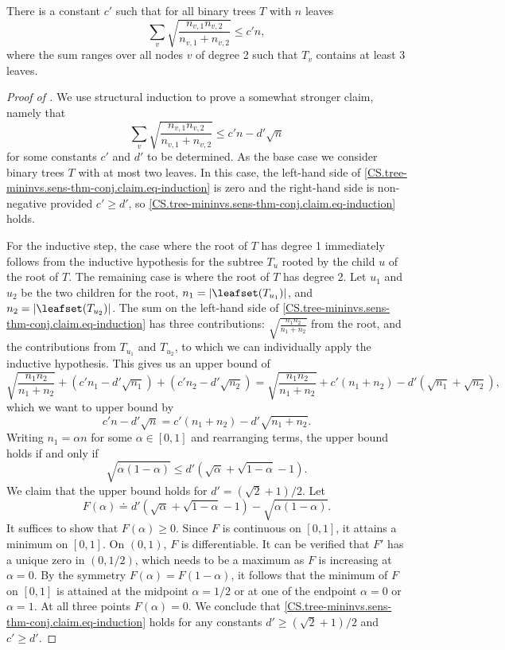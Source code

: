 \begin{claim}
    \label{claim:sensitivity:sum}
    There is a constant $c'$ such that for all binary trees $T$ with $n$ leaves 
    \begin{equation}
      \sum_v \sqrt{\frac{n_{v,1}n_{v,2}}{n_{v,1}+n_{v,2}}} \le c'n,
    \end{equation}
    where the sum ranges over all nodes $v$ of degree 2 such that $T_v$ contains at least 3 leaves.
  \end{claim}
\begin{proof}[Proof of ]
We use structural induction to prove a somewhat stronger claim, namely that
\begin{equation}\label{CS.tree-mininvs.sens-thm-conj.claim.eq-induction}
  \sum_v \sqrt{\frac{n_{v,1}n_{v,2}}{n_{v,1}+n_{v,2}}} \le c' n - d' \sqrt{n}
\end{equation}
for some constants $c'$ and $d'$ to be determined.
As the base case we consider binary trees $T$ with at most two leaves. In this case, the left-hand side of \eqref{CS.tree-mininvs.sens-thm-conj.claim.eq-induction} is zero and the right-hand side is non-negative provided $c' \ge d'$, so \eqref{CS.tree-mininvs.sens-thm-conj.claim.eq-induction} holds. 

For the inductive step, the case where the root of $T$ has degree 1 immediately follows from the inductive hypothesis for the subtree $T_u$ rooted by the child $u$ of the root of $T$. The remaining case is where the root of $T$ has degree 2. Let $u_1$ and $u_2$ be the two children for the root, $n_1 = \lvert\leafset(T_{u_1})\rvert$, and 
$n_2 = \lvert\leafset(T_{u_2})\rvert$. The sum on the left-hand side of \eqref{CS.tree-mininvs.sens-thm-conj.claim.eq-induction} has three contributions: $\sqrt{\frac{n_1 n_2}{n_1+n_2}}$ from the root, and the contributions from $T_{u_1}$ and $T_{u_2}$, to which we can individually apply the inductive hypothesis. This gives us an upper bound of
\[ \sqrt{\frac{n_1 n_2}{n_1+n_2}} + (c' n_1 - d' \sqrt{n_1}) + (c' n_2 - d' \sqrt{n_2})
=  \sqrt{\frac{n_1 n_2}{n_1+n_2}} + c' (n_1 + n_2) - d' (\sqrt{n_1} + \sqrt{n_2}), \]
which we want to upper bound by
\[ c' n - d' \sqrt{n} = c' (n_1 + n_2) - d' \sqrt{n_1+n_2}. \]
Writing $n_1 = \alpha n$ for some $\alpha \in [0,1]$ and rearranging terms, the upper bound holds if and only if
\[ \sqrt{\alpha(1-\alpha)} \le d' (\sqrt{\alpha} + \sqrt{1-\alpha} -1). \]
We claim that the upper bound holds for $d'= (\sqrt{2}+1)/2$. Let 
\[F(\alpha) \doteq d'(\sqrt{\alpha}+\sqrt{1-\alpha}-1)-\sqrt{\alpha(1-\alpha)}.\]
It suffices to show that $F(\alpha)\ge 0$. Since $F$ is continuous on $[0,1]$, it attains a minimum on $[0,1]$. On $(0,1)$, $F$ is differentiable. It can be verified that $F'$ has a unique zero in $(0,1/2)$, which needs to be a maximum as $F$ is increasing at $\alpha=0$. By the symmetry $F(\alpha)=F(1-\alpha)$, it follows that the minimum of $F$ on $[0,1]$ is attained at the midpoint $\alpha=1/2$ or at one of the endpoint $\alpha=0$ or $\alpha=1$. At all three points $F(\alpha)=0$. 
We conclude that \eqref{CS.tree-mininvs.sens-thm-conj.claim.eq-induction} holds for any constants $d' \ge (\sqrt{2}+1)/2$ and $c' \ge d'$.
\end{proof}



